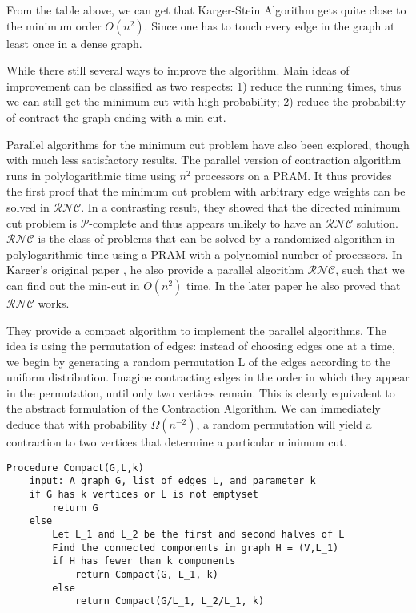 \documentclass[11pt]{article}
\theoremstyle{plain}
\theoremstyle{definition}
\theoremstyle{remark}
\begin{document}
	From the table above, we can get that Karger-Stein Algorithm gets quite close to the minimum order $ O(n^2) $. Since one has to touch every edge in the graph at least once in a dense graph.
	
	
	While there still several ways to improve the algorithm. Main ideas of improvement can be classified as two respects: 1) reduce the running times, thus we can still get the minimum cut with high probability; 2) reduce the probability of contract the graph ending with a min-cut. 
	
	
	Parallel algorithms for the minimum cut problem have also been explored, though with much less satisfactory results. The parallel version of contraction algorithm runs in polylogarithmic time using $ n^2 $ processors on a PRAM. It thus provides the first proof that the minimum cut problem with arbitrary edge weights can be solved in $ \mathcal{RNC} $. In a contrasting result, they showed that the directed minimum cut problem is $ \mathcal{P} $-complete and thus appears unlikely to have an $ \mathcal{RNC} $ solution. $ \mathcal{RNC} $ is the class of problems that can be solved by a randomized algorithm in polylogarithmic time using a PRAM with a polynomial number of processors.
	In Karger's original paper \cite{karger1993global}, he also provide a parallel algorithm $ \mathcal{RNC} $, such that we can find out the min-cut in $ O(n^2) $ time. In the later paper he also proved that $ \mathcal{RNC} $ works. 
	
	They provide a compact algorithm to implement the parallel algorithms. The idea is using the permutation of edges: instead of choosing edges one at a time, we begin by generating a random permutation L of the edges according to the uniform distribution. Imagine contracting edges in the order in which they appear in the permutation, until only two vertices remain. This is clearly equivalent to the abstract formulation of the Contraction Algorithm. We can immediately deduce that with probability $ \Omega(n^{-2}) $, a random permutation will yield a contraction to two vertices that determine a particular minimum cut.
	
	\begin{center}
	\begin{Verbatim}[frame = single]
	Procedure Compact(G,L,k)
	input: A graph G, list of edges L, and parameter k
	if G has k vertices or L is not emptyset
		return G
	else
		Let L_1 and L_2 be the first and second halves of L
		Find the connected components in graph H = (V,L_1)
		if H has fewer than k components
			return Compact(G, L_1, k)
		else 
			return Compact(G/L_1, L_2/L_1, k)
	\end{Verbatim}
	\end{center}
	
\end{document}
